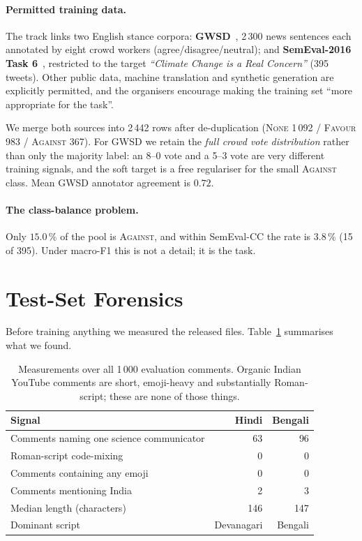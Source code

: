 \documentclass[twocolumn]{ceurart}
\begin{document}
\paragraph{Permitted training data.}
The track links two English stance corpora: \textbf{GWSD}~\cite{luo2020},
2\,300 news sentences each annotated by eight crowd workers
(agree/disagree/neutral); and \textbf{SemEval-2016 Task 6}~\cite{mohammad2016},
restricted to the target \emph{``Climate Change is a Real Concern''}
(395 tweets). Other public data, machine translation and synthetic generation
are explicitly permitted, and the organisers encourage making the training set
``more appropriate for the task''.

We merge both sources into 2\,442 rows after de-duplication
(\textsc{None} 1\,092 / \textsc{Favour} 983 / \textsc{Against} 367). For GWSD we
retain the \emph{full crowd vote distribution} rather than only the majority
label: an 8--0 vote and a 5--3 vote are very different training signals, and the
soft target is a free regulariser for the small \textsc{Against} class. Mean
GWSD annotator agreement is $0.72$.

\paragraph{The class-balance problem.}
Only $15.0\,\%$ of the pool is \textsc{Against}, and within SemEval-CC the rate
is $3.8\,\%$ (15 of 395). Under macro-F1 this is not a detail; it is the task.

\section{Test-Set Forensics}
\label{sec:forensics}

Before training anything we measured the released files. Table~\ref{tab:forensics}
summarises what we found.

\begin{table}[t]
\centering
\caption{Measurements over all 1\,000 evaluation comments. Organic Indian
YouTube comments are short, emoji-heavy and substantially Roman-script; these
are none of those things.}
\label{tab:forensics}
\begin{tabular}{lrr}
\toprule
Signal & Hindi & Bengali \\
\midrule
Comments naming one science communicator & 63 & 96 \\
Roman-script code-mixing & 0 & 0 \\
Comments containing any emoji & 0 & 0 \\
Comments mentioning India & 2 & 3 \\
Median length (characters) & 146 & 147 \\
Dominant script & Devanagari & Bengali \\
\bottomrule
\end{tabular}
\end{table}
\end{document}
